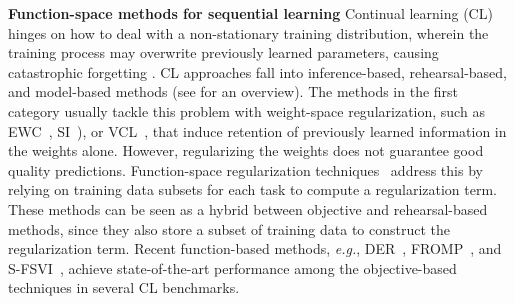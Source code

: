 \documentclass{article} %
\makeatletter
\newcommand{\eg}{\textit{e.g.\@}\xspace}
\makeatother
\begin{document}

\textbf{Function-space methods for sequential learning}
Continual learning (CL) hinges on how to deal with a non-stationary training distribution, wherein the training process may overwrite previously learned parameters, causing catastrophic forgetting \citep{mccloskey1989catastrophic}. CL approaches fall into inference-based, rehearsal-based, and model-based methods (see \cite{parisi2019continual, de2021continual} for an overview). The methods in the first category usually tackle this problem with weight-space regularization, such as EWC~\citep{kirkpatrick2017overcoming}, SI~\citep{zenke2017continual}), or VCL~\citep{nguyen-tuongModel2009}, that induce retention of previously learned information in the weights alone. However, regularizing the weights does not guarantee good quality predictions. Function-space regularization techniques~\cite{li2018lwf, benjamin2018measuring, titsias2019functional, buzzega2020dark, pan2020continual, rudner2022continual} address this by relying on training data subsets for each task to compute a regularization term.
These methods can be seen as a hybrid between objective and rehearsal-based methods, since they also store a subset of training data to construct the regularization term.
Recent function-based methods, \eg, DER~\citep{buzzega2020dark}, FROMP~\citep{pan2020continual}, and S-FSVI~\citep{rudner2022continual}, achieve state-of-the-art performance among the objective-based techniques in several CL benchmarks.
\end{document}
